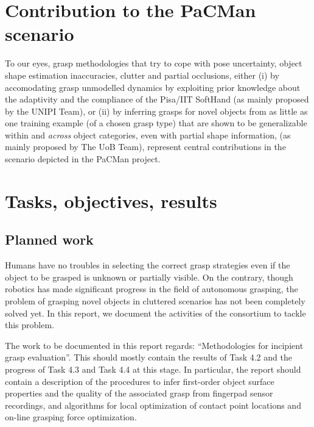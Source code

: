 \documentclass[a4paper,11pt,pdf]{pacmanreport}
\begin{document}
\section*{Contribution to the PaCMan scenario}

To our eyes, grasp methodologies that try to cope with pose uncertainty, object shape estimation inaccuracies, clutter and partial occlusions, either (i) by accomodating grasp unmodelled dynamics by exploiting prior knowledge about the adaptivity and the compliance of the Pisa/IIT SoftHand (as mainly proposed by the UNIPI Team), or (ii) by inferring grasps for novel objects from as little as one training example (of a chosen grasp type) that are shown to be generalizable within and \emph{across} object categories, even with partial shape information, (as mainly proposed by The UoB Team), represent central contributions in the scenario depicted in the PaCMan project.


\newpage

\section{Tasks, objectives, results}

\subsection{Planned work}

Humans have no troubles in selecting the correct grasp strategies even if the object to be grasped is unknown or partially visible. On the contrary, though robotics has made significant progress in the field of autonomous grasping, the problem of grasping novel objects in cluttered scenarios has not been completely solved yet. In this report, we document the activities of the consortium to tackle this problem.

The work to be documented in this report regards: ``Methodologies for incipient grasp evaluation''. This should mostly contain the results of Task 4.2 and the progress of Task 4.3 and Task 4.4 at this stage. In particular, the report should contain a description of the procedures to infer first-order object surface properties and the quality of the associated grasp from fingerpad sensor recordings, and algorithms for local optimization of contact point locations and on-line grasping force optimization.

\end{document}

